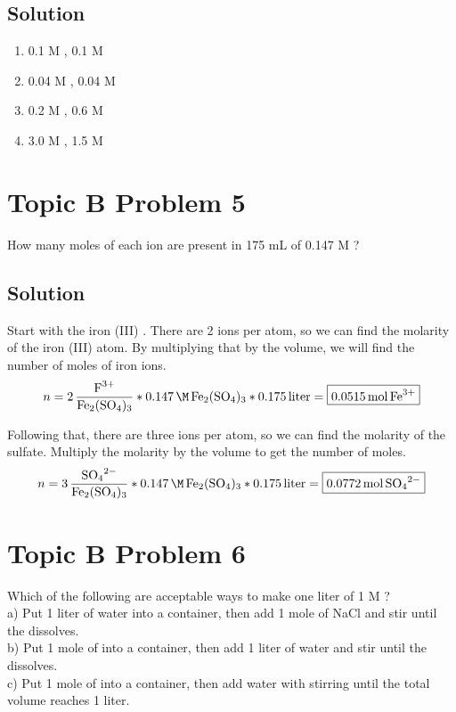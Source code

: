 \documentclass[10pt]{article}
\begin{document}
        \subsection{Solution}
            \begin{enumerate}[label=\alph*/]
                \item   0.1 M , 0.1 M 
                \item   0.04 M , 0.04 M 
                \item   0.2 M , 0.6 M 
                \item   3.0 M , 1.5 M 
            \end{enumerate}

    \pagebreak
    \section{Topic B Problem 5}
        How many moles of each ion are present in 175 mL of 0.147 M ?

        \subsection{Solution}
            Start with the iron (III) .
            There are 2  ions per  atom, so we can find the molarity of the iron (III) atom.
            By multiplying that by the volume, we will find the number of moles of iron ions.
            \begin{equation}
                n   =   2\,\ce{\frac{F^3+}{Fe2(SO4)3}} * 0.147\,\unit{\M}\,\ce{Fe2(SO4)3} * 0.175\,\unit{liter}
                    =   \boxed{0.0515\,\unit{\mole}\,\ce{Fe^3+}}
            \end{equation}

            Following that, there are three  ions per  atom, so we can find the molarity of the sulfate.
            Multiply the molarity by the volume to get the number of moles.
            \begin{equation}
                n   =   3\,\ce{\frac{SO4^2-}{Fe2(SO4)3}} * 0.147\,\unit{\M}\,\ce{Fe2(SO4)3} * 0.175\,\unit{liter}
                    =   \boxed{0.0772\,\unit{\mole}\,\ce{SO4^2-}}
            \end{equation}

    \pagebreak
    \section{Topic B Problem 6}
        Which of the following are acceptable ways to make one liter of 1 M ?\\
        a) Put 1 liter of water into a container, then add 1 mole of NaCl and stir until the  dissolves.\\
        b) Put 1 mole of  into a container, then add 1 liter of water and stir until the  dissolves.\\
        c) Put 1 mole of  into a container, then add water with stirring until the total volume reaches 1 liter.
\end{document}
